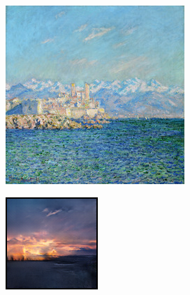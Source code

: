\documentclass{article}
\begin{document}
\begin{figure}[H]
\begin{subfigure}{.112\textwidth}
    \end{subfigure}\hspace{.010\textwidth}%
    \begin{subfigure}{.112\textwidth}
        \centering
        \includegraphics[width=\linewidth]{00020.jpg}
    \end{subfigure}%
    \begin{subfigure}{.112\textwidth}
        \centering
        \includegraphics[width=\linewidth]{0002.png}
    \end{subfigure}
    

\end{figure}
\end{document}
